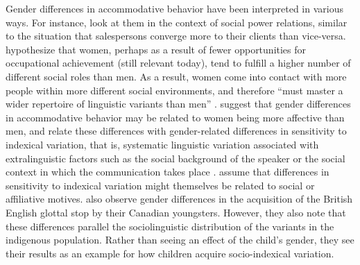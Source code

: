 \documentclass[output=paper,
modfonts
]{langscibook}
\begin{document}
Gender differences in accommodative behavior have been interpreted in various ways. For instance, \citet[20-21]{giles_accommodation_1991} look at them in the context of social power relations, similar to the situation that salespersons converge more to their clients than vice-versa. \cite{chambers_dialectology_1998} hypothesize that women, perhaps as a result of fewer opportunities for occupational achievement (still relevant today), tend to fulfill a higher number of different social roles than men. As a result, women come into contact with more people within more different social environments, and therefore ``must master a wider repertoire of linguistic variants than men'' \citep[85]{chambers_dialectology_1998}. \citet{willemyns_accent_1997} suggest that gender differences in accommodative behavior may be related to women being more affective than men, and 
% 
% 
% 
% 
% 
% 
%
% 
% 
% 
%
\citet{namy_gender_2002} relate these differences with gender-related differences in sensitivity to indexical variation, that is, systematic linguistic variation associated with extralinguistic factors such as the social background of the speaker or the social context in which the communication takes place . \citet{namy_gender_2002}  assume that differences in sensitivity to indexical variation might themselves be related to social or affiliative motives. \cite{tagliamonte_howd_2007} also observe gender differences in the acquisition of the British English glottal stop by their Canadian youngsters. However, they also note that these differences parallel the sociolinguistic distribution of the variants in the indigenous population. Rather than seeing an effect of the child's gender, they see their results as an example for how children acquire socio-indexical variation.
\end{document}
